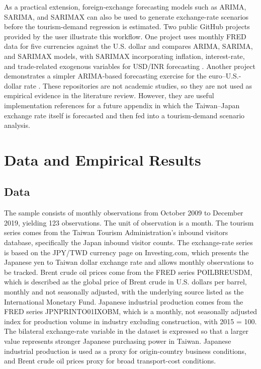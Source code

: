 \documentclass[12pt,a4paper]{article}
\begin{document}
As a practical extension, foreign-exchange forecasting models such as ARIMA, SARIMA, and SARIMAX can also be used to generate exchange-rate scenarios before the tourism-demand regression is estimated. Two public GitHub projects provided by the user illustrate this workflow. One project uses monthly FRED data for five currencies against the U.S. dollar and compares ARIMA, SARIMA, and SARIMAX models, with SARIMAX incorporating inflation, interest-rate, and trade-related exogenous variables for USD/INR forecasting \citep{rindhujatreesa_repo}. Another project demonstrates a simpler ARIMA-based forecasting exercise for the euro--U.S.-dollar rate \citep{shridhar_repo}. These repositories are not academic studies, so they are not used as empirical evidence in the literature review. However, they are useful implementation references for a future appendix in which the Taiwan--Japan exchange rate itself is forecasted and then fed into a tourism-demand scenario analysis.

\section{Data and Empirical Results}

\subsection{Data}

The sample consists of monthly observations from October 2009 to December 2019, yielding 123 observations. The unit of observation is a month. The tourism series comes from the Taiwan Tourism Administration's inbound visitors database, specifically the Japan inbound visitor counts. The exchange-rate series is based on the JPY/TWD currency page on Investing.com, which presents the Japanese yen to Taiwan dollar exchange rate and allows monthly observations to be tracked. Brent crude oil prices come from the FRED series POILBREUSDM, which is described as the global price of Brent crude in U.S. dollars per barrel, monthly and not seasonally adjusted, with the underlying source listed as the International Monetary Fund. Japanese industrial production comes from the FRED series JPNPRINTO01IXOBM, which is a monthly, not seasonally adjusted index for production volume in industry excluding construction, with 2015 = 100. The bilateral exchange-rate variable in the dataset is expressed so that a larger value represents stronger Japanese purchasing power in Taiwan. Japanese industrial production is used as a proxy for origin-country business conditions, and Brent crude oil prices proxy for broad transport-cost conditions.
\end{document}
